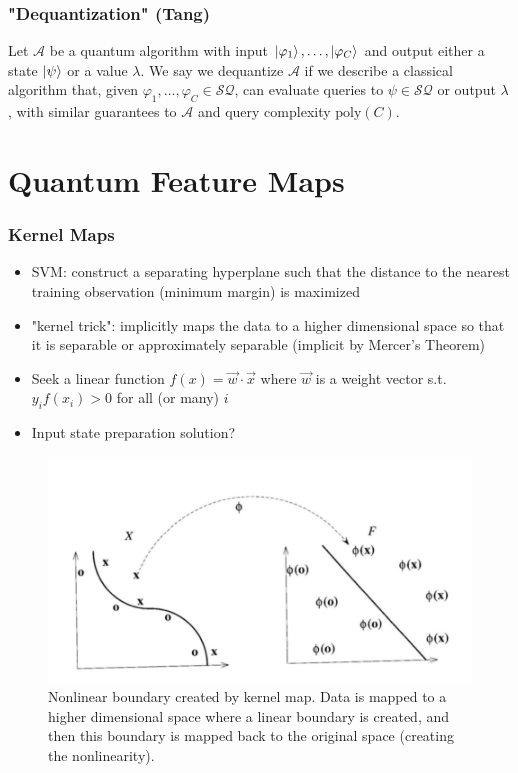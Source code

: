 \documentclass{beamer}
\newcommand\0{\mathbf{0}}
\newcommand\<{\langle}
\renewcommand\>{\rangle}
\renewcommand\phi{\varphi}
\begin{document}
\begin{frame}
\frametitle{"Dequantization" (Tang)}
\begin{definition}
 Let $\mathcal{A}$ be a quantum algorithm with input $\ket{\phi_1},\ldots,\ket{\phi_C}$ and output either a state $\ket{\psi}$ or a value $\lambda$. We say we dequantize $\mathcal{A}$ if we describe a classical algorithm that, given $\phi_1,\ldots,\phi_C \in \mathcal{SQ}$, can evaluate queries to $\psi \in \mathcal{SQ}$ or output $\lambda$, with similar guarantees to $\mathcal{A}$ and query complexity $\text{poly}(C)$.	
\end{definition}
\end{frame}

\section{Quantum Feature Maps}

\begin{frame}
\frametitle{Kernel Maps}
\begin{itemize}
\item SVM: construct a separating hyperplane such that the distance to the nearest training observation (minimum margin) is maximized
\item "kernel trick": implicitly maps the data to a higher dimensional space so that it is separable or approximately separable (implicit by Mercer's Theorem) 
\item Seek a linear function $f(x) = \vec{w} \cdot \vec{x}$ where $\vec{w}$ is a weight vector s.t. $y_if(x_i) > 0$ for all (or many) $i$
\item Input state preparation solution?
\end{itemize}

\begin{figure}[H]
\centering
\includegraphics[width= 0.7\linewidth]{images/kernel}
\caption{Nonlinear boundary created by kernel map. Data is mapped to a higher dimensional space where a linear boundary is created, and then this boundary is mapped back to the original space (creating the nonlinearity).}
\end{figure}

\end{frame}
\end{document}
